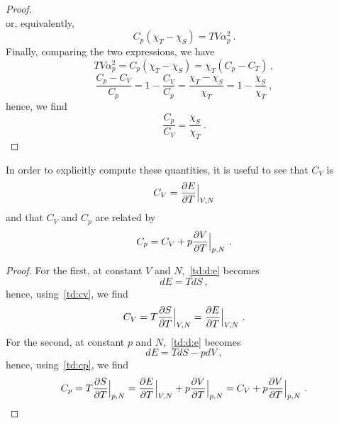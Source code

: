 \begin{proof}
\begin{equation*}
        \end{equation*}
        or, equivalently,
        \begin{equation*}
            C_p (\chi_T - \chi_S) = T V \alpha_p^2 ~.
        \end{equation*}
        Finally, comparing the two expressions, we have 
        \begin{equation*}
            T V \alpha_p^2 = C_p (\chi_T - \chi_S) = \chi_T (C_p - C_T) ~,
        \end{equation*}
        \begin{equation*}
            \frac{C_p - C_V}{C_p} = 1 - \frac{C_V}{C_p} = \frac{\chi_T - \chi_S}{\chi_T} = 1 - \frac{\chi_S}{\chi_T} ~,
        \end{equation*}
        hence, we find 
        \begin{equation*}
            \frac{C_p}{C_V} = \frac{\chi_S}{\chi_T} ~.
        \end{equation*}
    \end{proof}

    In order to explicitly compute these quantities, it is useful to see that $C_V$ is 
    \begin{equation}\label{td:cv2}
        C_V = \frac{\partial E}{\partial T} \Big \vert_{V, N}
    \end{equation}
    and that $C_V$ and $C_p$ are related by 
    \begin{equation}\label{td:cp2}
        C_p = C_V + p \frac{\partial V}{\partial T} \Big \vert_{p, N}~.
    \end{equation}
    \begin{proof}
        For the first, at constant $V$ and $N$,~\eqref{td:d:e} becomes 
        \begin{equation*}
            dE = T dS ~,
        \end{equation*}
        hence, using~\eqref{td:cv}, we find 
        \begin{equation*}
            C_V = T \frac{\partial S}{\partial T} \Big \vert_{V, N} = \frac{\partial E}{\partial T} \Big \vert_{V, N} ~.
        \end{equation*}
        For the second, at constant $p$ and $N$,~\eqref{td:d:e} becomes 
        \begin{equation*}
            dE = T dS - pdV ~,
        \end{equation*}
        hence, using~\eqref{td:cp}, we find 
        \begin{equation*}
            C_p = T \frac{\partial S}{\partial T} \Big \vert_{p, N} = \frac{\partial E}{\partial T} \Big \vert_{V, N} + p \frac{\partial V}{\partial T} \Big \vert_{p, N} = C_V + p \frac{\partial V}{\partial T} \Big \vert_{p, N} ~.
        \end{equation*}
    \end{proof}

